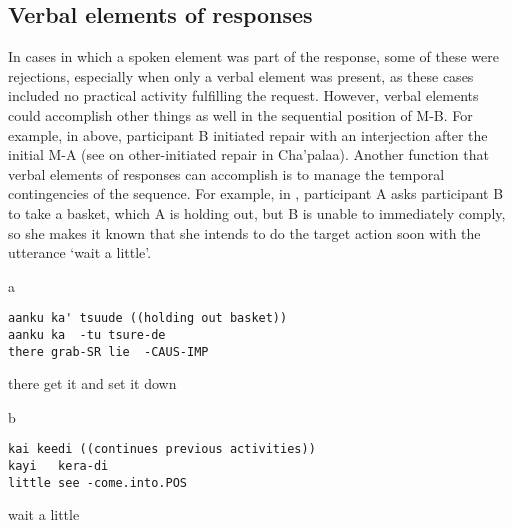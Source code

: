 \documentclass[output=paper]{langsci/langscibook}
\begin{document}
\subsection{Verbal elements of responses}\label{sec:floyd:4.2}

In cases in which a spoken element was part of the response, some of these were rejections, especially when only a verbal element was present, as these cases included no practical activity fulfilling the request. However, verbal elements could accomplish other things as well in the sequential position of M-B. For example, in  above, participant B initiated repair with an interjection after the initial M-A (see \citealt{Floyd2015} on other-initiated repair in Cha'palaa). Another function that verbal elements of responses can accomplish is to manage the temporal contingencies of the sequence. For example, in , participant A asks participant B to take a basket, which A is holding out, but B is unable to immediately comply, so she makes it known that she intends to do the target action soon with the utterance ‘wait a little’. %

\vspace{-1mm}
%
\begin{mdframednoverticalspace}[style=firstfoc]
\begin{transbox}{1}{a}
\begin{verbatim}
aanku ka' tsuude ((holding out basket))
aanku ka  -tu tsure-de
there grab-SR lie  -CAUS-IMP
\end{verbatim}
there get it and set it down
\end{transbox}
\end{mdframednoverticalspace}
%
\begin{mdframednoverticalspace}[style=secondfoc]
\begin{transbox}{2}{b}
\begin{verbatim}
kai keedi ((continues previous activities))
kayi   kera-di
little see -come.into.POS
\end{verbatim}
wait a little
\end{transbox}
\end{mdframednoverticalspace}
%
%
\begin{mdframednoverticalspace}[style=secondfoc]
\end{mdframednoverticalspace}
\end{document}
